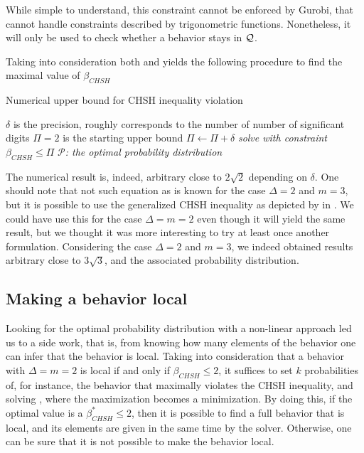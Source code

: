 While simple to understand, this constraint cannot be enforced by Gurobi, that
cannot handle constraints described by trigonometric functions. Nonetheless, it
will only be used to check whether a behavior stays in $\mathcal{Q}$. 

Taking into consideration both  and
 yields the following procedure to find the
maximal value of $\beta_{CHSH}$

\begin{algorithm}[H]
\caption{Numerical upper bound for CHSH inequality violation}
\begin{algorithmic}[1]
    \Require $\delta$  is the precision, roughly corresponds to the number of number of significant digits
    \Require $\Pi = 2$ is the starting upper bound
        \State $\Pi \leftarrow \Pi + \delta$
        \State \textit{solve  with constraint $\beta_{CHSH} \leq \Pi$}
    \EndWhile
    \State \Return $\mathcal P$\textit{: the optimal probability distribution}
\end{algorithmic}
\label{alg:beta-optimal-chsh}
\end{algorithm}

The numerical result is, indeed, arbitrary close to $2 \sqrt 2$ depending on
$\delta$. One should note that not such equation as
 is known for the case $\Delta = 2$ and $m=3$, but it is
possible to use the generalized CHSH inequality as depicted by \citeauthor{wehner_tsirelson_2006} in
\cite{wehner_tsirelson_2006}. We could have use this
for the case $\Delta = m = 2$ even though it will yield
the same result, but we thought it was more interesting to try at least once another 
formulation. Considering the case $\Delta = 2$ and $m=3$, we indeed obtained results 
arbitrary close to $3 \sqrt 3$, and the associated probability distribution.

\subsection{Making a behavior local}

Looking for the optimal probability distribution with a non-linear approach led
us to a side work, that is, from knowing how many elements of the behavior one 
can infer that the behavior is local. Taking into consideration that a behavior with
$\Delta = m = 2$ is local if and only if $\beta_{CHSH} \leq 2$, it suffices to
set $k$ probabilities of, for instance, the behavior that maximally violates the
CHSH inequality, and solving , where the
maximization becomes a minimization. By doing this, if the optimal value is a
$\beta^*_{CHSH} \leq 2$, then it is possible to find a full behavior that is local,
and its elements are given in the same time by the solver. Otherwise, one
can be sure that it is not possible to make the behavior local.


